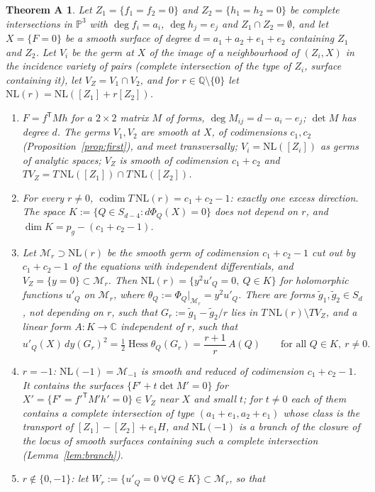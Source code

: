 \documentclass[11pt]{article}
\numberwithin{equation}{section}
\newtheorem*{thmA}{Theorem A}
\theoremstyle{remark}
\newcommand{\PP}{\mathbb{P}}
\newcommand{\CC}{\mathbb{C}}
\newcommand{\QQ}{\mathbb{Q}}
\newcommand{\NL}{\mathrm{NL}}
\newcommand{\VZ}{V_Z}
\newcommand{\cM}{\mathcal{M}}
\newcommand{\Hess}{\operatorname{Hess}}
\newcommand{\codim}{\operatorname{codim}}
\newcommand{\gt}{\tilde g}
\begin{document}
\begin{thmA}
Let $Z_1=\{f_1=f_2=0\}$ and $Z_2=\{h_1=h_2=0\}$ be complete intersections in $\PP^3$ with $\deg f_i=a_i$,
$\deg h_j=e_j$ and $Z_1\cap Z_2=\emptyset$, and let $X=\{F=0\}$ be a smooth surface of degree
$d=a_1+a_2+e_1+e_2$ containing $Z_1$ and $Z_2$. Let $V_i$ be the germ at $X$ of the image of a neighbourhood of
$(Z_i,X)$ in the incidence variety of pairs \textup{(}complete intersection of the type of $Z_i$, surface
containing it\textup{)}, let $\VZ=V_1\cap V_2$, and for $r\in\QQ\setminus\{0\}$
let $\NL(r)=\NL([Z_1]+r[Z_2])$.
\begin{enumerate}[label=\textup{(\arabic*)}]
\item $F=f^{\mathsf T}Mh$ for a $2\times2$ matrix $M$ of forms, $\deg M_{ij}=d-a_i-e_j$; $\det M$ has degree $d$.
The germs $V_1,V_2$ are smooth at $X$, of codimensions $c_1,c_2$ \textup{(}Proposition~\ref{prop:first}\textup{)},
and meet transversally; $V_i=\NL([Z_i])$ as germs of analytic spaces; $\VZ$ is smooth of codimension $c_1+c_2$
and $T\VZ=T\,\NL([Z_1])\cap T\,\NL([Z_2])$.
\item For every $r\neq0$, $\codim T\,\NL(r)=c_1+c_2-1$: exactly one excess direction. The space
$K:=\{Q\in S_{d-4}:d\Phi_Q(X)=0\}$ does not depend on $r$, and $\dim K=p_g-(c_1+c_2-1)$.
\item Let $\cM_r\supset\NL(r)$ be the smooth germ of codimension $c_1+c_2-1$ cut out by $c_1+c_2-1$ of the
equations with independent differentials, and $\VZ=\{y=0\}\subset\cM_r$. Then
$\NL(r)=\{y^2u'_Q=0,\ Q\in K\}$ for holomorphic functions $u'_Q$ on $\cM_r$, where $\theta_Q:=\Phi_Q|_{\cM_r}
=y^2u'_Q$. There are forms $\gt_1,\gt_2\in S_d$, not depending on $r$, such that $G_r:=\gt_1-\gt_2/r$ lies in
$T\,\NL(r)\setminus T\VZ$, and a linear form $A\colon K\to\CC$ \emph{independent of $r$}, such that
\[
u'_Q(X)\,dy(G_r)^2=\tfrac12\Hess\theta_Q(G_r)=\frac{r+1}{r}\,A(Q)\qquad\text{for all }Q\in K,\ r\neq0 .
\]
\item $r=-1$: $\NL(-1)=\cM_{-1}$ is smooth and reduced of codimension $c_1+c_2-1$. It contains the surfaces
$\{F'+t\det M'=0\}$ for $X'=\{F'=f'^{\mathsf T}M'h'=0\}\in\VZ$ near $X$ and small $t$; for $t\neq0$ each of them
contains a complete intersection of type $(a_1+e_1,a_2+e_1)$ whose class is the transport of
$[Z_1]-[Z_2]+e_1H$, and $\NL(-1)$ is a branch of the closure of the locus of smooth surfaces containing such
a complete intersection \textup{(}Lemma~\ref{lem:branch}\textup{)}.
\item $r\notin\{0,-1\}$: let $W_r:=\{u'_Q=0\ \forall Q\in K\}\subset\cM_r$, so that

\end{enumerate}
\end{thmA}
\end{document}
